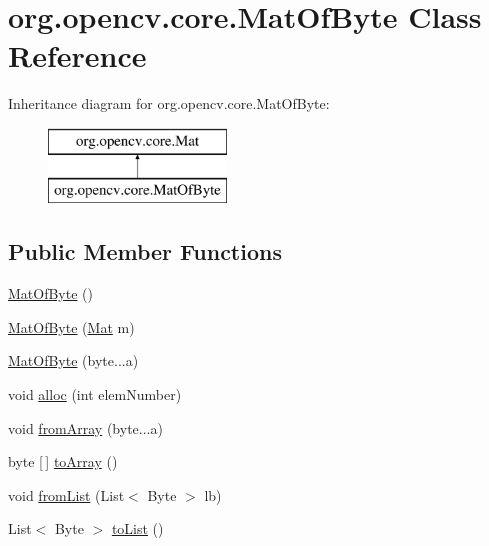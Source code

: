 \hypertarget{classorg_1_1opencv_1_1core_1_1_mat_of_byte}{}\section{org.\+opencv.\+core.\+Mat\+Of\+Byte Class Reference}
\label{classorg_1_1opencv_1_1core_1_1_mat_of_byte}
Inheritance diagram for org.\+opencv.\+core.\+Mat\+Of\+Byte\+:\begin{figure}[H]
\begin{center}
\leavevmode
\includegraphics[height=2.000000cm]{classorg_1_1opencv_1_1core_1_1_mat_of_byte}
\end{center}
\end{figure}
\subsection*{Public Member Functions}
\begin{DoxyCompactItemize}
\item 
\mbox{\hyperlink{classorg_1_1opencv_1_1core_1_1_mat_of_byte_a47362cf5e0bf0fb16560ad3f1d2baf09}{Mat\+Of\+Byte}} ()
\item 
\mbox{\hyperlink{classorg_1_1opencv_1_1core_1_1_mat_of_byte_ab4d7aaf8c04aabf2d2f3fa29430b4b73}{Mat\+Of\+Byte}} (\mbox{\hyperlink{classorg_1_1opencv_1_1core_1_1_mat}{Mat}} m)
\item 
\mbox{\hyperlink{classorg_1_1opencv_1_1core_1_1_mat_of_byte_a49160b6cd622b0bea52278e97dc32bc5}{Mat\+Of\+Byte}} (byte...\+a)
\item 
void \mbox{\hyperlink{classorg_1_1opencv_1_1core_1_1_mat_of_byte_a5c598bb9f9a24edee0ba6707cbf68ef8}{alloc}} (int elem\+Number)
\item 
void \mbox{\hyperlink{classorg_1_1opencv_1_1core_1_1_mat_of_byte_a1e082c26db3f90a5bae9ec2b5c1f42b5}{from\+Array}} (byte...\+a)
\item 
byte \mbox{[}$\,$\mbox{]} \mbox{\hyperlink{classorg_1_1opencv_1_1core_1_1_mat_of_byte_a4b8a8d2eabce32face589dbbdabba4c3}{to\+Array}} ()
\item 
void \mbox{\hyperlink{classorg_1_1opencv_1_1core_1_1_mat_of_byte_a7e824a7b4da55930daf53ec683b8b238}{from\+List}} (List$<$ Byte $>$ lb)
\item 
List$<$ Byte $>$ \mbox{\hyperlink{classorg_1_1opencv_1_1core_1_1_mat_of_byte_a26f2a350b9694b16a254fbca69a7d98e}{to\+List}} ()
\end{DoxyCompactItemize}
